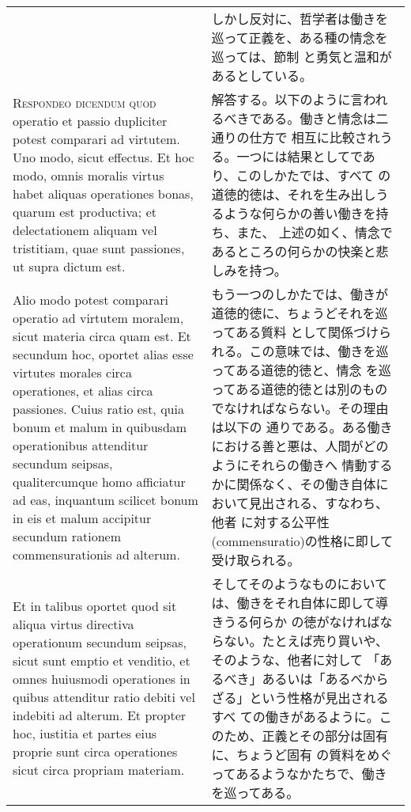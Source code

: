 \documentclass[10pt]{jsarticle}
\begin{document}
\begin{longtable}{p{21em}p{21em}}
 &

しかし反対に、哲学者は働きを巡って正義を、ある種の情念を巡っては、節制
と勇気と温和があるとしている。
 
\\



 {\scshape Respondeo dicendum quod} operatio et passio dupliciter
 potest comparari ad virtutem. Uno modo, sicut effectus. Et hoc modo,
 omnis moralis virtus habet aliquas operationes bonas, quarum est
 productiva; et delectationem aliquam vel tristitiam, quae sunt
 passiones, ut supra dictum est.

&

 解答する。以下のように言われるべきである。働きと情念は二通りの仕方で
 相互に比較されうる。一つには結果としてであり、このしかたでは、すべて
 の道徳的徳は、それを生み出しうるような何らかの善い働きを持ち、また、
 上述の如く、情念であるところの何らかの快楽と悲しみを持つ。
 
\\

 Alio modo potest comparari operatio ad virtutem moralem, sicut
 materia circa quam est. Et secundum hoc, oportet alias esse virtutes
 morales circa operationes, et alias circa passiones. Cuius ratio est,
 quia bonum et malum in quibusdam operationibus attenditur secundum
 seipsas, qualitercumque homo afficiatur ad eas, inquantum scilicet
 bonum in eis et malum accipitur secundum rationem commensurationis ad
 alterum.

&

 もう一つのしかたでは、働きが道徳的徳に、ちょうどそれを巡ってある質料
 として関係づけられる。この意味では、働きを巡ってある道徳的徳と、情念
 を巡ってある道徳的徳とは別のものでなければならない。その理由は以下の
 通りである。ある働きにおける善と悪は、人間がどのようにそれらの働きへ
 情動するかに関係なく、その働き自体において見出される、すなわち、他者
 に対する公平性(commensuratio)の性格に即して受け取られる。

 
 
\\

 Et in talibus oportet quod sit aliqua virtus directiva operationum
 secundum seipsas, sicut sunt emptio et venditio, et omnes huiusmodi
 operationes in quibus attenditur ratio debiti vel indebiti ad
 alterum. Et propter hoc, iustitia et partes eius proprie sunt circa
 operationes sicut circa propriam materiam.


 &

 そしてそのようなものにおいては、働きをそれ自体に即して導きうる何らか
 の徳がなければならない。たとえば売り買いや、そのような、他者に対して
 「あるべき」あるいは「あるべからざる」という性格が見出されるすべ
 ての働きがあるように。このため、正義とその部分は固有に、ちょうど固有
 の質料をめぐってあるようなかたちで、働きを巡ってある。


\end{longtable}
\end{document}
